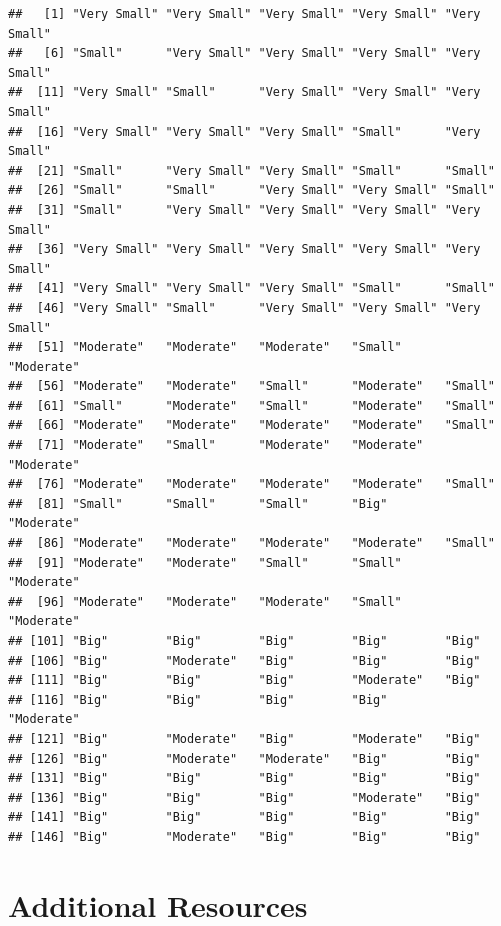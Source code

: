 \documentclass[
]{book}
\begin{document}
\begin{verbatim}
##   [1] "Very Small" "Very Small" "Very Small" "Very Small" "Very Small"
##   [6] "Small"      "Very Small" "Very Small" "Very Small" "Very Small"
##  [11] "Very Small" "Small"      "Very Small" "Very Small" "Very Small"
##  [16] "Very Small" "Very Small" "Very Small" "Small"      "Very Small"
##  [21] "Small"      "Very Small" "Very Small" "Small"      "Small"     
##  [26] "Small"      "Small"      "Very Small" "Very Small" "Small"     
##  [31] "Small"      "Very Small" "Very Small" "Very Small" "Very Small"
##  [36] "Very Small" "Very Small" "Very Small" "Very Small" "Very Small"
##  [41] "Very Small" "Very Small" "Very Small" "Small"      "Small"     
##  [46] "Very Small" "Small"      "Very Small" "Very Small" "Very Small"
##  [51] "Moderate"   "Moderate"   "Moderate"   "Small"      "Moderate"  
##  [56] "Moderate"   "Moderate"   "Small"      "Moderate"   "Small"     
##  [61] "Small"      "Moderate"   "Small"      "Moderate"   "Small"     
##  [66] "Moderate"   "Moderate"   "Moderate"   "Moderate"   "Small"     
##  [71] "Moderate"   "Small"      "Moderate"   "Moderate"   "Moderate"  
##  [76] "Moderate"   "Moderate"   "Moderate"   "Moderate"   "Small"     
##  [81] "Small"      "Small"      "Small"      "Big"        "Moderate"  
##  [86] "Moderate"   "Moderate"   "Moderate"   "Moderate"   "Small"     
##  [91] "Moderate"   "Moderate"   "Small"      "Small"      "Moderate"  
##  [96] "Moderate"   "Moderate"   "Moderate"   "Small"      "Moderate"  
## [101] "Big"        "Big"        "Big"        "Big"        "Big"       
## [106] "Big"        "Moderate"   "Big"        "Big"        "Big"       
## [111] "Big"        "Big"        "Big"        "Moderate"   "Big"       
## [116] "Big"        "Big"        "Big"        "Big"        "Moderate"  
## [121] "Big"        "Moderate"   "Big"        "Moderate"   "Big"       
## [126] "Big"        "Moderate"   "Moderate"   "Big"        "Big"       
## [131] "Big"        "Big"        "Big"        "Big"        "Big"       
## [136] "Big"        "Big"        "Big"        "Moderate"   "Big"       
## [141] "Big"        "Big"        "Big"        "Big"        "Big"       
## [146] "Big"        "Moderate"   "Big"        "Big"        "Big"
\end{verbatim}

\hypertarget{additional-resources-7}{%
\section*{Additional Resources}\label{additional-resources-7}}
\end{document}
